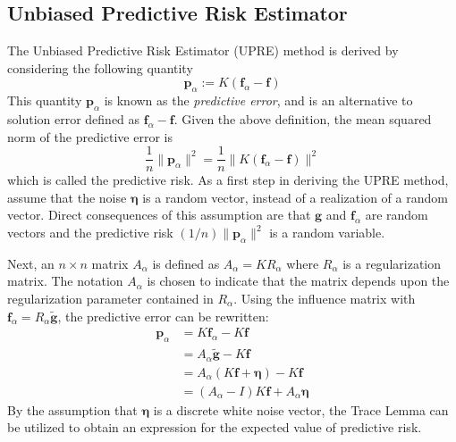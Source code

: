 \documentclass[12pt]{article}
\newcommand{\gdis}{\mathbf{g}}
\newcommand{\gnoise}{\widetilde{\mathbf{g}}}
\newcommand{\kmat}{K}	%
\newcommand{\fdis}{\mathbf{f}}
\newcommand{\regparam}{\alpha}
\newcommand{\R}{R_{\regparam}}	%
\newcommand{\freg}{\fdis_{\regparam}}	%
\newcommand{\noise}{\bm{\eta}}	%
\newcommand{\PE}{\mathbf{p}_{\regparam}}	%
\newcommand{\A}{A_{\regparam}}	%
\begin{document}
\subsection{Unbiased Predictive Risk Estimator} \label{Unbiased Predictive Risk Estimator}
The Unbiased Predictive Risk Estimator (UPRE) method is derived by considering the following quantity
\[\PE := \kmat(\freg - \fdis)\]
This quantity $\PE$ is known as the \textit{predictive error}, and is an alternative to solution error defined as $\freg - \fdis$. Given the above definition, the mean squared norm of the predictive error is
\[\frac{1}{n}\|\PE\|^2 = \frac{1}{n}\|\kmat(\freg - \fdis)\|^2\]
which is called the predictive risk.  As a first step in deriving the UPRE method, assume that the noise $\noise$ is a random vector, instead of a realization of a random vector. Direct consequences of this assumption are that $\gdis$ and $\freg$ are random vectors and the predictive risk $(1/n)\|\PE\|^2$ is a random variable. \par
Next, an $n \times n$ matrix $\A$ is defined as $\A = \kmat\R$ where $\R$ is a regularization matrix. The notation $\A$ is chosen to indicate that the matrix depends upon the regularization parameter contained in $\R$. Using the influence matrix with $\freg = \R\gnoise$, the predictive error can be rewritten:
\begin{align*}
\PE &= \kmat\freg - \kmat\fdis \\
&= \A\gnoise - \kmat\fdis \\
&= \A(\kmat\fdis + \noise) - \kmat\fdis \\
&= (\A - I)\kmat\fdis + \A\noise
\end{align*}
By the assumption that $\noise$ is a discrete white noise vector, the Trace Lemma can be utilized to obtain an expression for the expected value of predictive risk.
\end{document}
